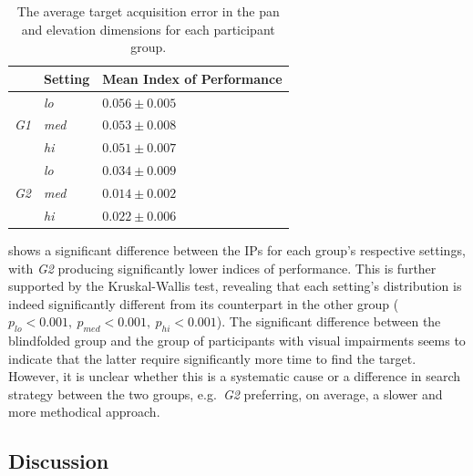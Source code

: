 \documentclass[]{interact}
\begin{document}
\begin{table}
  \centering
  \caption{The average target acquisition error in the pan and elevation dimensions for each participant group. }\label{tab:fitts-results}
  \begin{tabular}{p{0.5cm}p{1.5cm}p{2.5cm}}
    \toprule
    & Setting      & Mean Index of Performance \\ \midrule
    & \textit{lo}  & $0.056\pm0.005$ \\
    \textit{G1} & \textit{med} & $0.053\pm0.008$ \\
		& \textit{hi}  & $0.051\pm0.007$ \\ \cline{2-3}
    & \textit{lo}  & $0.034\pm0.009$ \\
    \textit{G2} & \textit{med} & $0.014\pm0.002$ \\
    & \textit{hi}  & $0.022\pm0.006$ \\
    \bottomrule
  \end{tabular}
\end{table}

 shows a significant difference between the IPs for each group's respective settings, with \textit{G2} producing significantly lower indices of performance.
This is further supported by the Kruskal-Wallis test, revealing that each setting's distribution is indeed significantly different from its counterpart in the other group ($p_{lo} < 0.001,~p_{med} < 0.001,~p_{hi} < 0.001$).
The significant difference between the blindfolded group and the group of participants with visual impairments seems to indicate that the latter require significantly more time to find the target. 
However, it is unclear whether this is a systematic cause or a difference in search strategy between the two groups, e.g.\ \textit{G2} preferring, on average, a slower and more methodical approach.

\subsection{Discussion}
\end{document}
